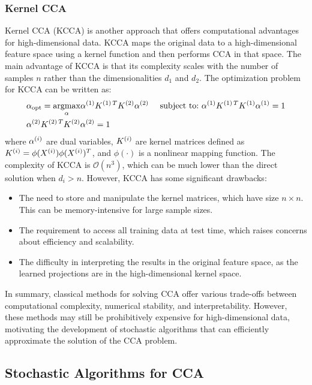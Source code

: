 \subsubsection{Kernel CCA}
Kernel CCA (KCCA) is another approach that offers computational advantages for high-dimensional data. KCCA maps the original data to a high-dimensional feature space using a kernel function and then performs CCA in that space. The main advantage of KCCA is that its complexity scales with the number of samples $n$ rather than the dimensionalities $d_1$ and $d_2$.
The optimization problem for KCCA can be written as:
\begin{align}
& \alpha_{\text{opt}} = \underset{\alpha}{\mathrm{argmax}} { \alpha^{(1)} K^{(1)\,T} K^{(2)} \alpha^{(2)} } \
& \text{subject to:} \notag \
& \alpha^{(1)} K^{(1)\,T} K^{(1)} \alpha^{(1)} = 1 \notag \\
& \alpha^{(2)} K^{(2)\,T} K^{(2)} \alpha^{(2)} = 1 \notag
\end{align}
where $\alpha^{(i)}$ are dual variables, $K^{(i)}$ are kernel matrices defined as $K^{(i)} = \phi(X^{(i)})\phi(X^{(i)})^T$, and $\phi(\cdot)$ is a nonlinear mapping function.
The complexity of KCCA is $\mathcal{O}(n^3)$, which can be much lower than the direct solution when $d_i > n$. However, KCCA has some significant drawbacks:
\begin{itemize}
    \item The need to store and manipulate the kernel matrices, which have size $n \times n$. This can be memory-intensive for large sample sizes.
    \item The requirement to access all training data at test time, which raises concerns about efficiency and scalability.
    \item The difficulty in interpreting the results in the original feature space, as the learned projections are in the high-dimensional kernel space.
\end{itemize}

In summary, classical methods for solving CCA offer various trade-offs between computational complexity, numerical stability, and interpretability. However, these methods may still be prohibitively expensive for high-dimensional data, motivating the development of stochastic algorithms that can efficiently approximate the solution of the CCA problem.

\subsection{Stochastic Algorithms for CCA}

